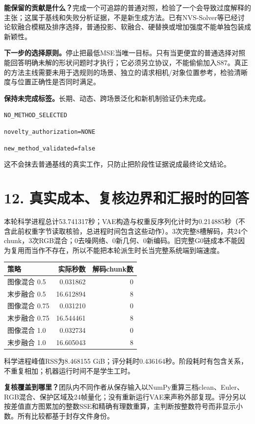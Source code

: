 \documentclass[UTF8,10pt,a4paper]{ctexart}
\begin{document}
\textbf{能保留的贡献是什么？}完成一个可追踪的普通对照，检验了一个会导致过度解释的主张；这属于基线和失败分析证据，不是新生成方法。已有NVS-Solver等已经讨论软融合模糊及排序选择，普通投影、软融合、硬替换或增加强度不能单独包装成新颖性。

\textbf{下一步的选择原则。}停止把最低MSE当唯一目标。只有当更便宜的普通选择对照能回答明确未解的形状问题时才执行；它必须另立协议，不能偷偷加入S87。真正的方法主线需要未用于选规则的场景、独立的请求相机/对象位置参考，检验清晰度与位置正确性是否同时满足。

\textbf{保持未完成标签。}长期、动态、跨场景泛化和新机制验证仍未完成。
\par\noindent\texttt{NO\_METHOD\_SELECTED}\par
\noindent\texttt{novelty\_authorization=NONE}\par
\noindent\texttt{new\_method\_validated=false}\par
这不会抹去普通基线的真实工作，只防止把阶段性证据说成最终论文结论。

\clearpage
\section*{12. 真实成本、复核边界和汇报时的回答}
本轮科学进程总计53.741317秒；VAE构造与权重反序列化计时为0.214885秒（不含此前权重字节读取核验，总进程时间包含这些动作）。3次完整8槽解码，共24个chunk，3次RGB混合；0去噪网络、0新几何、0新编码。旧完整G0链成本不能因为复用而当作不存在，所以不能把本轮派生时长当完整系统端到端速度。
\begin{center}\small\begin{tabular}{lrr}\toprule
策略 & 实际秒数 & 解码chunk数\\\midrule
图像混合 0.5 & 0.031862 & 0\\
末步融合 0.5 & 16.612894 & 8\\
图像混合 0.75 & 0.031210 & 0\\
末步融合 0.75 & 16.544461 & 8\\
图像混合 1.0 & 0.032734 & 0\\
末步融合 1.0 & 16.605043 & 8\\
\bottomrule\end{tabular}\end{center}
科学进程峰值RSS为8.468155 GiB；评分耗时0.436164秒。阶段耗时有包含关系，不重复相加；机器运行时间不是学生工时。

\textbf{复核覆盖到哪里？}团队内不同作者从保存输入以NumPy重算三档clean、Euler、RGB混合、保护区域及24帧量化；没有重新运行VAE来声称外部复现。评分另以按差值直方图累加的整数SSE和精确有理数重算，主判断按整数符号而非显示小数。所有比较都基于封存文件身份。
\end{document}
